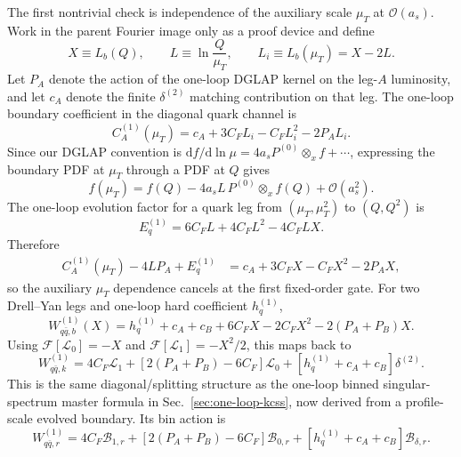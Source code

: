 \documentclass[11pt]{article}
\newcommand{\dd}{\mathrm{d}}
\newcommand{\deltaT}{\delta^{(2)}}
\newcommand{\ox}{\otimes_x}
\newcommand{\order}[1]{\mathcal{O}\!\left(#1\right)}
\begin{document}
The first nontrivial check is independence of the auxiliary scale $\mu_T$ at
$\order{a_s}$.  Work in the parent Fourier image only as a proof device and define
\begin{equation}
  X\equiv L_b(Q),
  \qquad
  L\equiv\ln\frac{Q}{\mu_T},
  \qquad
  L_i\equiv L_b(\mu_T)=X-2L .
  \label{eq:wproto-X-L-v12}
\end{equation}
Let $P_A$ denote the action of the one-loop DGLAP kernel on the leg-$A$ luminosity, and
let $c_A$ denote the finite $\delta^{(2)}$ matching contribution on that leg.  The
one-loop boundary coefficient in the diagonal quark channel is
\begin{equation}
  C_A^{(1)}(\mu_T)
  =c_A+3C_FL_i-C_FL_i^2-2P_A L_i .
  \label{eq:wproto-leg-boundary-v12}
\end{equation}
Since our DGLAP convention is
$\dd f/\dd\ln\mu=4a_sP^{(0)}\ox f+\cdots$, expressing the boundary PDF at
$\mu_T$ through a PDF at $Q$ gives
\begin{equation}
  f(\mu_T)=f(Q)-4a_sL\,P^{(0)}\ox f(Q)+\order{a_s^2}.
  \label{eq:wproto-pdf-conversion-v12}
\end{equation}
The one-loop evolution factor for a quark leg from $(\mu_T,\mu_T^2)$ to $(Q,Q^2)$ is
\begin{equation}
  E_q^{(1)}=6C_FL+4C_FL^2-4C_FLX .
  \label{eq:wproto-leg-evolution-v12}
\end{equation}
Therefore
\begin{align}
  C_A^{(1)}(\mu_T)-4LP_A+E_q^{(1)}
  &=c_A+3C_FX-C_FX^2-2P_A X,
  \label{eq:wproto-leg-identity-v12}
\end{align}
so the auxiliary $\mu_T$ dependence cancels at the first fixed-order gate.  For two
Drell--Yan legs and one-loop hard coefficient $h_q^{(1)}$,
\begin{equation}
  W_{q\bar q,b}^{(1)}(X)
  =h_q^{(1)}+c_A+c_B+6C_FX-2C_FX^2-2(P_A+P_B)X .
  \label{eq:wproto-bspace-one-loop-v12}
\end{equation}
Using $\mathcal F[\mathcal L_0]=-X$ and
$\mathcal F[\mathcal L_1]=-X^2/2$, this maps back to
\begin{equation}
  \boxed{
  W_{q\bar q,k}^{(1)}
  =4C_F\mathcal L_1
  +\left[2(P_A+P_B)-6C_F\right]\mathcal L_0
  +\left[h_q^{(1)}+c_A+c_B\right]\deltaT .}
  \label{eq:wproto-kspace-one-loop-v12}
\end{equation}
This is the same diagonal/splitting structure as the one-loop binned singular-spectrum
master formula in Sec.~\ref{sec:one-loop-kcss}, now derived from a profile-scale
evolved boundary.  Its bin action is
\begin{equation}
  W_{q\bar q,r}^{(1)}
  =4C_F\mathcal B_{1,r}
  +\left[2(P_A+P_B)-6C_F\right]\mathcal B_{0,r}
  +\left[h_q^{(1)}+c_A+c_B\right]\mathcal B_{\delta,r}.
  \label{eq:wproto-bin-one-loop-v12}
\end{equation}
\end{document}
